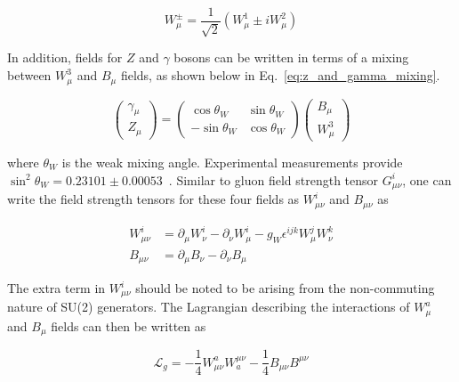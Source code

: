 \begin{equation}
    W^{\pm}_{\mu} = \frac{1}{\sqrt{2}} \left( W^{1}_{\mu} \pm i W^{2}_{\mu} \right)
\end{equation}

In addition, fields for $Z$ and $\gamma$ bosons can be written in terms of a mixing between $W_{\mu}^{3}$ and $B_{\mu}$ fields, 
as shown below in Eq.~\ref{eq:z_and_gamma_mixing}.

\begin{equation}
    \begin{pmatrix}
        \gamma_{\mu} \\ Z_{\mu}
    \end{pmatrix}
    = 
    \begin{pmatrix}
        \cos \theta_{W} & \sin \theta_{W} \\ 
        - \sin \theta_{W} & \cos \theta_{W}
    \end{pmatrix}
    \begin{pmatrix}
        B_{\mu} \\ W^{3}_{\mu}
    \end{pmatrix}
    \label{eq:z_and_gamma_mixing}
\end{equation}

where $\theta_{W}$ is the weak mixing angle. Experimental measurements provide $\sin^2 \theta_{W} = 0.23101 \pm 0.00053$~\cite{CMS:WeakMixingAngleMeasurement}.
Similar to gluon field strength tensor $G_{\mu\nu}^{i}$, one can write the field strength tensors for these four fields as $W_{\mu\nu}^{i}$ and $B_{\mu\nu}$ as

\begin{equation}
    \begin{split}
        W_{\mu\nu}^{i} &= \partial_{\mu} W_{\nu}^{i} - \partial_{\nu} W_{\mu}^{i} - g_{W} \epsilon^{ijk} W_{\mu}^{j} W_{\nu}^{k} \\
        B_{\mu\nu}     &= \partial_{\mu} B_{\nu}     - \partial_{\nu} B_{\mu}
    \end{split}
    \label{eq:field_strength_ew}
\end{equation}

The extra term in $W_{\mu\nu}^{i}$ should be noted to be arising from the non-commuting nature of SU(2) generators.
The Lagrangian describing the interactions of $W_{\mu}^{a}$ and $B_{\mu}$ fields can then be written as

\begin{equation}
    \mathcal{L}_{g} = -\frac{1}{4} W_{\mu\nu}^{a} W^{\mu\nu}_{a} -\frac{1}{4} B_{\mu\nu} B^{\mu\nu}
    \label{eq:lagrangian_kinetic_term}
\end{equation}

